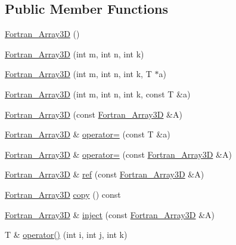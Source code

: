 \subsection*{Public Member Functions}
\begin{DoxyCompactItemize}
\item 
\hyperlink{classTNT_1_1Fortran__Array3D_a21a80db962738ae9b44f900a67a12d9d}{Fortran\-\_\-\-Array3\-D} ()
\item 
\hyperlink{classTNT_1_1Fortran__Array3D_ae21aebe248a70f8aebb02019ca234018}{Fortran\-\_\-\-Array3\-D} (int m, int n, int k)
\item 
\hyperlink{classTNT_1_1Fortran__Array3D_afc769243d26ea77ee409b50b61ae8e6a}{Fortran\-\_\-\-Array3\-D} (int m, int n, int k, T $\ast$a)
\item 
\hyperlink{classTNT_1_1Fortran__Array3D_af2ef9c1ce37546da4f2e63ec2ac33537}{Fortran\-\_\-\-Array3\-D} (int m, int n, int k, const T \&a)
\item 
\hyperlink{classTNT_1_1Fortran__Array3D_a80a98d39df23c4b3a59c7952387c07c8}{Fortran\-\_\-\-Array3\-D} (const \hyperlink{classTNT_1_1Fortran__Array3D}{Fortran\-\_\-\-Array3\-D} \&A)
\item 
\hyperlink{classTNT_1_1Fortran__Array3D}{Fortran\-\_\-\-Array3\-D} \& \hyperlink{classTNT_1_1Fortran__Array3D_afb4adfeb473778f57769bca704245aa5}{operator=} (const T \&a)
\item 
\hyperlink{classTNT_1_1Fortran__Array3D}{Fortran\-\_\-\-Array3\-D} \& \hyperlink{classTNT_1_1Fortran__Array3D_a64f8785f3d81e07cb2df6e1bd7eefde5}{operator=} (const \hyperlink{classTNT_1_1Fortran__Array3D}{Fortran\-\_\-\-Array3\-D} \&A)
\item 
\hyperlink{classTNT_1_1Fortran__Array3D}{Fortran\-\_\-\-Array3\-D} \& \hyperlink{classTNT_1_1Fortran__Array3D_a344143d5f036e6bc72d111b83b577ed5}{ref} (const \hyperlink{classTNT_1_1Fortran__Array3D}{Fortran\-\_\-\-Array3\-D} \&A)
\item 
\hyperlink{classTNT_1_1Fortran__Array3D}{Fortran\-\_\-\-Array3\-D} \hyperlink{classTNT_1_1Fortran__Array3D_a489cacee41c5f270017b13de6aa83dff}{copy} () const 
\item 
\hyperlink{classTNT_1_1Fortran__Array3D}{Fortran\-\_\-\-Array3\-D} \& \hyperlink{classTNT_1_1Fortran__Array3D_aa2b78e3242a7506843c10642fc289ce1}{inject} (const \hyperlink{classTNT_1_1Fortran__Array3D}{Fortran\-\_\-\-Array3\-D} \&A)
\item 
T \& \hyperlink{classTNT_1_1Fortran__Array3D_a18c12002351d9b7ef7cd1b483ebb1c9f}{operator()} (int i, int j, int k)
\item 

\end{DoxyCompactItemize}
